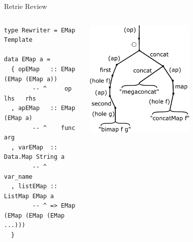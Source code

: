 \documentclass{beamer}
\begin{document}
  \begin{frame}[fragile]{Retrie Review}
    
    \begin{columns}
      \begin{column}{0.5\textwidth}
        \begin{verbatim}
type Rewriter = EMap Template

data EMap a =
  { opEMap   :: EMap (EMap (EMap a))
        -- ^     op   lhs   rhs
  , apEMap   :: EMap (EMap a)
        -- ^    func  arg
  , varEMap  :: Data.Map String a
        -- ^            var_name
  , listEMap :: ListMap EMap a
        -- ^ => EMap (EMap (EMap (EMap ...)))
  }
        \end{verbatim}
      \end{column}
      \begin{column}{0.5\textwidth}  %
        \begin{flushright}
        \includegraphics[width=0.6\textwidth]{trieOne}
        \end{flushright}
      \end{column}
    \end{columns}


  \end{frame}
\end{document}
